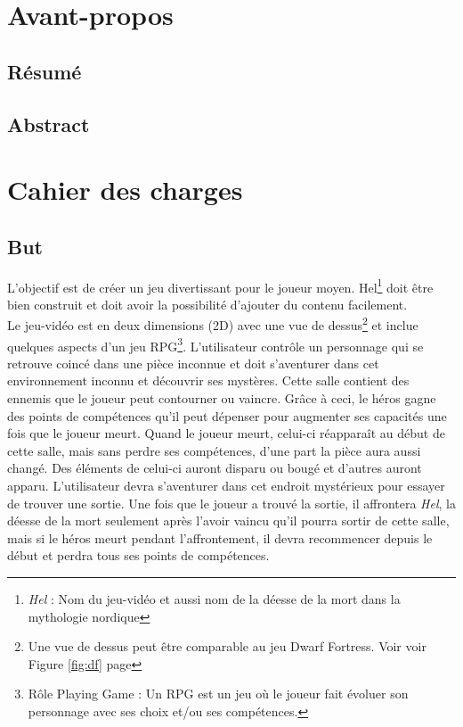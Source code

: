 \documentclass[11pt, a4paper, oneside]{report}
\newcommand{\projectTitle}{Hel}
\begin{document}
\chapter{Avant-propos}
\section{Résumé}
\section{Abstract}
\newpage
\tableofcontents
\newpage
\chapter{Cahier des charges}
\section{But}
L'objectif est de créer un jeu divertissant pour le joueur moyen. \projectTitle\footnote{\textit{\projectTitle} : Nom du jeu-vidéo et aussi nom de la déesse de la mort dans la mythologie nordique} doit être bien construit et doit avoir la possibilité d'ajouter du contenu facilement.\\[.5cm]
Le jeu-vidéo est en deux dimensions (2D) avec une vue de dessus\footnote{Une vue de dessus peut être comparable au jeu Dwarf Fortress. Voir voir Figure \ref{fig:df} page \pageref{fig:df}} et inclue quelques aspects d'un jeu RPG\footnote{Rôle Playing Game : Un RPG est un jeu où le joueur fait évoluer son personnage avec ses choix et/ou ses compétences.}. L'utilisateur contrôle un personnage qui se retrouve coincé dans une pièce inconnue et doit s'aventurer dans cet environnement inconnu et découvrir ses mystères. Cette salle contient des ennemis que le joueur peut contourner ou vaincre. Grâce à ceci, le héros gagne des points de compétences qu'il peut dépenser pour augmenter ses capacités une fois que le joueur meurt. Quand le joueur meurt, celui-ci réapparaît au début de cette salle, mais sans perdre ses compétences, d'une part la pièce aura aussi changé. Des éléments de celui-ci auront disparu ou bougé et d'autres auront apparu. L'utilisateur devra s'aventurer dans cet endroit mystérieux pour essayer de trouver une sortie. Une fois que le joueur a trouvé la sortie, il affrontera \emph{Hel}, la déesse de la mort seulement après l'avoir vaincu qu'il pourra sortir de cette salle, mais si le héros meurt pendant l'affrontement, il devra recommencer depuis le début et perdra tous ses points de compétences.
\end{document}
